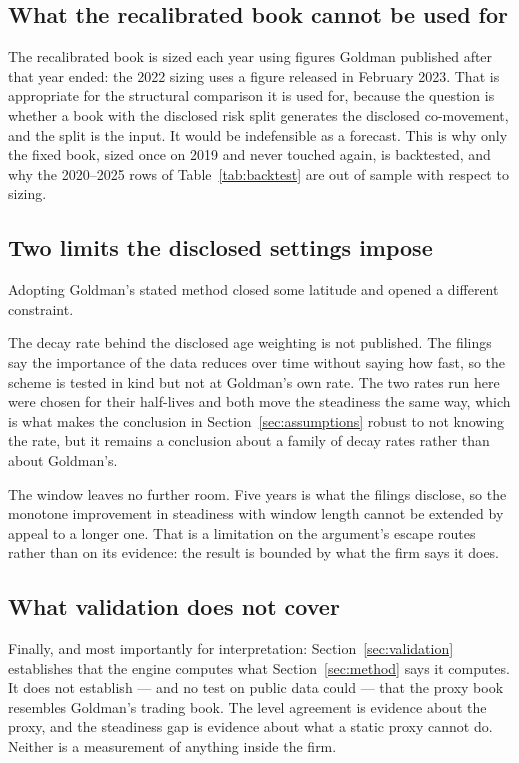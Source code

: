 \subsection{What the recalibrated book cannot be used for}

The recalibrated book is sized each year using figures Goldman published after
that year ended: the 2022 sizing uses a figure released in February 2023. That
is appropriate for the structural comparison it is used for, because the
question is whether a book with the disclosed risk split generates the
disclosed co-movement, and the split is the input. It would be indefensible as
a forecast. This is why only the fixed book, sized once on 2019 and never
touched again, is backtested, and why the 2020--2025 rows of
Table~\ref{tab:backtest} are out of sample with respect to sizing.

\subsection{Two limits the disclosed settings impose}

Adopting Goldman's stated method closed some latitude and opened a different
constraint.

The decay rate behind the disclosed age weighting is not published. The filings
say the importance of the data reduces over time without saying how fast, so
the scheme is tested in kind but not at Goldman's own rate. The two rates run
here were chosen for their half-lives and both move the steadiness the same
way, which is what makes the conclusion in Section~\ref{sec:assumptions} robust
to not knowing the rate, but it remains a conclusion about a family of decay
rates rather than about Goldman's.

The window leaves no further room. Five years is what the filings disclose, so
the monotone improvement in steadiness with window length cannot be extended by
appeal to a longer one. That is a limitation on the argument's escape routes
rather than on its evidence: the result is bounded by what the firm says it
does.

\subsection{What validation does not cover}

Finally, and most importantly for interpretation: Section~\ref{sec:validation}
establishes that the engine computes what Section~\ref{sec:method} says it
computes. It does not establish --- and no test on public data could --- that
the proxy book resembles Goldman's trading book. The level agreement is
evidence about the proxy, and the steadiness gap is evidence about what a
static proxy cannot do. Neither is a measurement of anything inside the firm.
